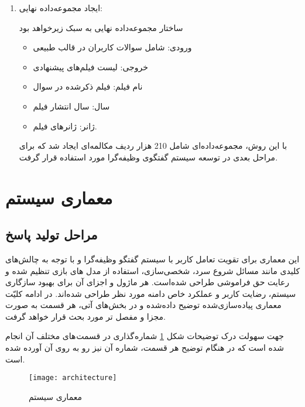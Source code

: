 \begin{enumerate}
\item
ایجاد مجموعه‌داده نهایی: 

ساختار مجموعه‌داده نهایی به سبک زیرخواهد بود
\begin{itemize}
\item
ورودی: شامل سوالات کاربران در قالب طبیعی
\item
خروجی: لیست فیلم‌های پیشنهادی
\item
نام فیلم: فیلم ذکر‌شده در سوال
\item
سال: سال انتشار فیلم
\item
ژانر: ژانرهای فیلم.

\end{itemize}

با این روش، مجموعه‌داده‌ای شامل 210 هزار ردیف مکالمه‌ای ایجاد شد که برای مراحل بعدی در توسعه سیستم گفتگوی وظیفه‌گرا مورد استفاده قرار گرفت.


\end{enumerate}

\section{معماری سیستم}
\label{sec:architecture}
\subsection{مراحل تولید پاسخ}

این معماری برای تقویت تعامل کاربر با سیستم گفتگو وظیفه‌گرا و با  توجه به چالش‌های کلیدی مانند مسائل شروع سرد، شخصی‌سازی، استفاده از مدل های بازی تنظیم شده و رعایت حق فراموشی طراحی شده‌است. هر ماژول و اجزای آن برای بهبود سازگاری سیستم، رضایت کاربر و عملکرد خاص دامنه مورد نظر طراحی شده‌اند. در ادامه کلیّت معماری پیاده‌سازی‌شده توضیح داده‌شده و در بخش‌های آتی، هر قسمت به صورت مجزا و مفصل تر مورد بحث قرار خواهد گرفت.

جهت سهولت درک توضیحات شکل%
\ref{fig:architecture}
شماره گذاری در قسمت های مختلف آن انجام شده است که در هنگام توضیح هر قسمت، شماره آن نیز رو به روی آن آورده شده است.


\begin{figure}[ht]
	\centerline{\texttt{[image: architecture]}}
	\caption{معماری سیستم}
	\label{fig:architecture}
\end{figure}


